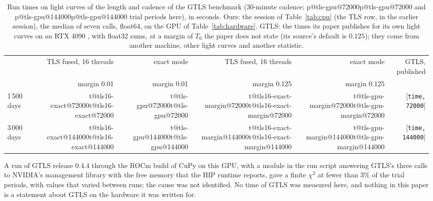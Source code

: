 \documentclass{aastex631}
\makeatletter
\providecommand{\Gt}[2]{[\texttt{#1, #2}]}
\newcommand{\T}[2]{\ifcsname t@#1@#2\endcsname\csname t@#1@#2\endcsname\else[\texttt{\detokenize{#1, #2}}]\fi}
\newcommand{\NP}[2]{\ifcsname p@#1@#2\endcsname\csname p@#1@#2\endcsname\else[\texttt{\detokenize{#1, #2}}]\fi}
\makeatother
\begin{document}
\begin{table}[htbp]
\centering
\caption{Run times on light curves of the length and cadence of the GTLS benchmark (30-minute cadence; \NP{tls-gpu}{72000} and \NP{tls-gpu}{144000} trial periods here), in seconds. Ours: the session of Table~\ref{tab:cpu} (the TLS row, in the earlier session), the median of seven calls, float64, on the GPU of Table~\ref{tab:hardware}. GTLS: the times its paper publishes for its own light curves on an RTX 4090 \citep[Sect.~3.4]{Hu2026}, with float32 sums, at a margin of $T_0$ the paper does not state (its source's default is $0.125$); they come from another machine, other light curves and another statistic.}\label{tab:gtlstimes}
\small
\begin{tabular}{lrrrrr}
\toprule
 & TLS fused, 16 threads & exact mode & TLS fused, 16 threads & exact mode & GTLS, published \\
 & margin 0.01 & margin 0.01 & margin 0.125 & margin 0.125 & \\
\midrule
1\,500 days & \T{tls16-exact}{72000} & \T{tls-gpu}{72000} & \T{tls16-exact-margin}{72000} & \T{tls-gpu-margin}{72000} & \Gt{time}{72000} \\
3\,000 days & \T{tls16-exact}{144000} & \T{tls-gpu}{144000} & \T{tls16-exact-margin}{144000} & \T{tls-gpu-margin}{144000} & \Gt{time}{144000} \\
\bottomrule
\end{tabular}
\end{table}
A run of GTLS release 0.4.4 through the ROCm build of CuPy on this GPU, with a module in the run script answering GTLS's three calls to NVIDIA's management library with the free memory that the HIP runtime reports, gave a finite $\chi^2$ at fewer than 3\% of the trial periods, with values that varied between runs; the cause was not identified. No time of GTLS was measured here, and nothing in this paper is a statement about GTLS on the hardware it was written for.

\FloatBarrier
\end{document}
